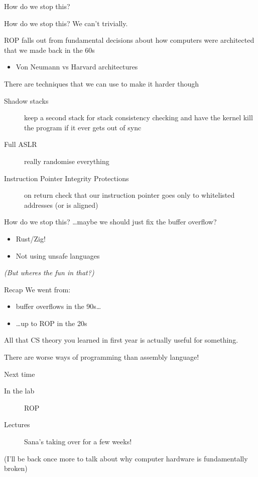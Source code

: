\documentclass[9pt,aspectratio=169]{beamer}
\begin{document}
\begin{frame}[label={sec:org7d4fadc}]{How do we stop this?}
\end{frame}
\begin{frame}[label={sec:org8d5bd7c}]{How do we stop this?}
We can't trivially.

ROP falls out from fundamental decisions about how computers were architected that we made back in the 60s
\begin{itemize}
\item Von Neumann vs Harvard architectures
\end{itemize}

There are techniques that we can use to make it harder though
\begin{description}
\item[{Shadow stacks}] keep a second stack for stack consistency checking and have the kernel kill the program if it ever gets out of sync
\item[{Full ASLR}] really randomise everything
\item[{Instruction Pointer Integrity Protections}] on return check that our instruction pointer goes only to whitelisted addresses (or is aligned)
\end{description}
\end{frame}

\begin{frame}[label={sec:orgbf87c0f}]{How do we stop this?}
\ldots{}maybe we should just fix the buffer overflow?
\begin{itemize}
\item Rust/Zig!
\item Not using unsafe languages

\vfill
\end{itemize}
\emph{(But wheres the fun in that?)}
\end{frame}

\begin{frame}[label={sec:org7072f90}]{Recap}
We went from:
\begin{itemize}
\item buffer overflows in the 90s\ldots{}
\item \ldots{}up to ROP in the 20s
\end{itemize}

All that CS theory you learned in first year is actually useful for something.

There are worse ways of programming than assembly language!

\begin{block}{Next time}
\begin{description}
\item[{In the lab}] ROP
\item[{Lectures}] Sana's taking over for a few weeks!
\end{description}

(I'll be back once more to talk about why computer hardware is fundamentally broken)
\end{block}
\end{frame}
\end{document}
